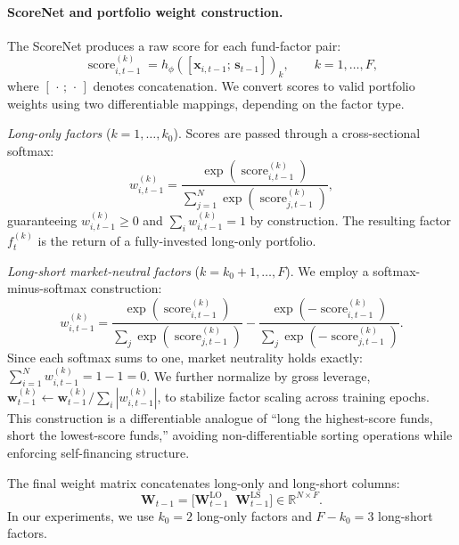 \paragraph{ScoreNet and portfolio weight construction.} The ScoreNet produces a raw score for each fund-factor pair:
\begin{equation}\label{eq:scorenet}
    \operatorname{score}_{i,t-1}^{(k)} = h_\phi\!\left([\mathbf{x}_{i,t-1};\, \mathbf{s}_{t-1}]\right)_k, \qquad k = 1, \ldots, F,
\end{equation}
where $[\,\cdot\,;\,\cdot\,]$ denotes concatenation. We convert scores to valid portfolio weights using two differentiable mappings, depending on the factor type.

\emph{Long-only factors} ($k = 1, \ldots, k_0$). Scores are passed through a cross-sectional softmax:
\begin{equation}\label{eq:long-only}
    w_{i,t-1}^{(k)} = \frac{\exp\!\left(\operatorname{score}_{i,t-1}^{(k)}\right)}{\sum_{j=1}^{N} \exp\!\left(\operatorname{score}_{j,t-1}^{(k)}\right)},
\end{equation}
guaranteeing $w_{i,t-1}^{(k)} \geq 0$ and $\sum_{i} w_{i,t-1}^{(k)} = 1$ by construction. The resulting factor $f_t^{(k)}$ is the return of a fully-invested long-only portfolio.

\emph{Long-short market-neutral factors} ($k = k_0+1, \ldots, F$). We employ a softmax-minus-softmax construction:
\begin{equation}\label{eq:long-short}
    w_{i,t-1}^{(k)} = \frac{\exp\!\left(\operatorname{score}_{i,t-1}^{(k)}\right)}{\sum_{j} \exp\!\left(\operatorname{score}_{j,t-1}^{(k)}\right)} - \frac{\exp\!\left(-\operatorname{score}_{i,t-1}^{(k)}\right)}{\sum_{j} \exp\!\left(-\operatorname{score}_{j,t-1}^{(k)}\right)}.
\end{equation}
Since each softmax sums to one, market neutrality holds exactly: $\sum_{i=1}^{N} w_{i,t-1}^{(k)} = 1 - 1 = 0$. We further normalize by gross leverage, $\mathbf{w}_{t-1}^{(k)} \leftarrow \mathbf{w}_{t-1}^{(k)} \big/ \sum_{i} |w_{i,t-1}^{(k)}|$, to stabilize factor scaling across training epochs. This construction is a differentiable analogue of ``long the highest-score funds, short the lowest-score funds,'' avoiding non-differentiable sorting operations while enforcing self-financing structure.

The final weight matrix concatenates long-only and long-short columns:
\begin{equation}\label{eq:weight-matrix}
    \mathbf{W}_{t-1} = \big[\mathbf{W}_{t-1}^{\mathrm{LO}} \;\; \mathbf{W}_{t-1}^{\mathrm{LS}}\big] \in \mathbb{R}^{N \times F}.
\end{equation}
In our experiments, we use $k_0 = 2$ long-only factors and $F - k_0 = 3$ long-short factors.

